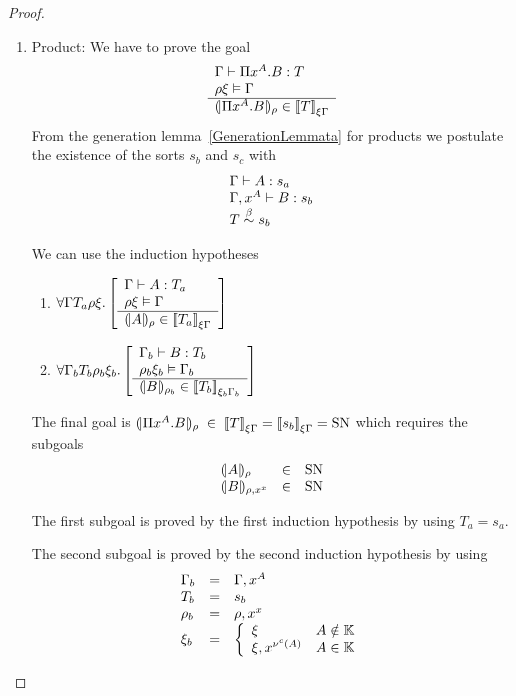 \begin{theorem}
\begin{proof}
\begin{enumerate}
        \item Product: We have to prove the goal
            $$
                \begin{array}{l}  \Gamma \vdash \Pi x^A.B : T \\ \rho \xi \vDash \Gamma  \\ \hline  {(\!|\Pi x^A.B|\!)_{\rho}} \in {{[\![}T{]\!]}}_{\xi\Gamma} \end{array}
            $$
            From the generation lemma~\ref{GenerationLemmata} for products
            we postulate the existence of the sorts $s_b$ and $s_c$ with
            $$
            \begin{array}{l}
                \Gamma \vdash A: s_a
                \\
                \Gamma,x^A \vdash B: s_b
                \\
                T \stackrel{\beta}{\sim} s_b
            \end{array}
            $$

            We can use the induction hypotheses
            \begin{enumerate}
            \item
                $\forall \Gamma T_a \rho \xi. \left[ \begin{array}{l}  \Gamma \vdash A : T_a \\ \rho \xi \vDash \Gamma  \\ \hline  {(\!|A|\!)_{\rho}} \in {{[\![}T_a{]\!]}}_{\xi\Gamma} \end{array} \right]$

            \item
                $\forall \Gamma_b T_b \rho_b \xi_b. \left[ \begin{array}{l}  \Gamma_b \vdash B : T_b \\ \rho_b \xi_b \vDash \Gamma_b  \\ \hline  {(\!|B|\!)_{\rho_b}} \in {{[\![}T_b{]\!]}}_{\xi_b\Gamma_b} \end{array} \right]$
            \end{enumerate}

            The final goal is
            ${(\!|\Pi x^A.B|\!)_{\rho}}
            \;\in\;
            {{[\![} T{]\!]}}_{\xi\Gamma}
            = {{[\![} s_b{]\!]}}_{\xi\Gamma}
            =\text{SN}$
            which requires the subgoals
            $$
            \begin{array}{lll}
                {(\!|A|\!)_{\rho}} &\in& \text{SN}
                \\
                {(\!|B|\!)_{\rho,x^x}} &\in& \text{SN}
            \end{array}
            $$

            The first subgoal is proved by the first induction hypothesis by
            using $T_a = s_a$.

            The second subgoal is proved by the second induction hypothesis by
            using
            $$
            \begin{array}{lll}
                \Gamma_b &=& \Gamma,x^A
                \\
                T_b      &=& s_b
                \\
                \rho_b   &=& \rho,x^x
                \\
                \xi_b    &=&
                    \left\{
                    \begin{array}{ll}
                        \xi & A \notin \mathbb{K}
                        \\
                        \xi,x^{\nu^c(A)}  & A \in \mathbb{K}
                    \end{array}
                    \right.
            \end{array}
            $$


\end{enumerate}
\end{proof}
\end{theorem}
